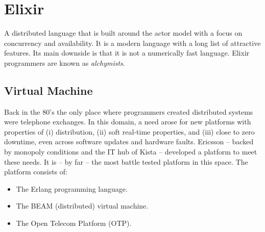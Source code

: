 {
\setmonofont[
  Contextuals={Alternate}
]{Fira Code}

\section{Elixir}
\label{lang:elixir}

A distributed language that is built around the actor model with a focus on concurrency and availability. It is a modern language with a long list of attractive features. Its main downside is that it is not a numerically fast language. Elixir programmers are known as \textsl{alchymists}.

\subsection{Virtual Machine}

Back in the 80's the only place where programmers created distributed systems were telephone exchanges. In this domain, a need arose for new platforms with properties of (i) distribution, (ii) soft real-time properties, and (iii) close to zero downtime, even across software updates and hardware faults. Ericsson -- backed by monopoly conditions and the IT hub of Kista -- developed a platform to meet these needs. It is -- by far -- the most battle tested platform in this space. The platform consists of:
\begin{itemize}
  \item The Erlang programming language.
  \item The BEAM (distributed) virtual machine.
  \item The Open Telecom Platform (OTP).
\end{itemize}

}
